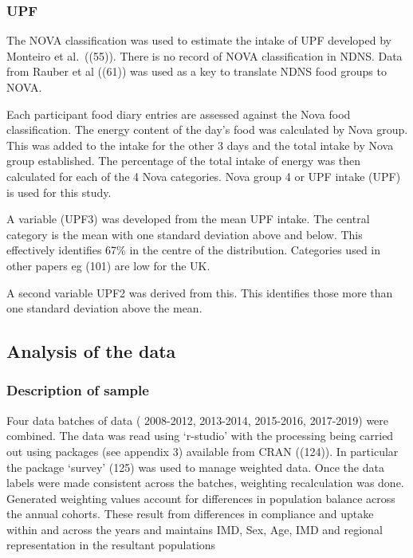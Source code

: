 \documentclass[
]{article}
\begin{document}
\hypertarget{upf}{%
\subsubsection{UPF}\label{upf}}

The NOVA classification was used to estimate the intake of UPF developed
by Monteiro et al.~((55)). There is no record of NOVA classification in
NDNS. Data from Rauber et al ((61)) was used as a key to translate NDNS
food groups to NOVA.

Each participant food diary entries are assessed against the Nova food
classification. The energy content of the day's food was calculated by
Nova group. This was added to the intake for the other 3 days and the
total intake by Nova group established. The percentage of the total
intake of energy was then calculated for each of the 4 Nova categories.
Nova group 4 or UPF intake (UPF) is used for this study.

A variable (UPF3) was developed from the mean UPF intake. The central
category is the mean with one standard deviation above and below. This
effectively identifies 67\% in the centre of the distribution.
Categories used in other papers eg (101) are low for the UK.

A second variable UPF2 was derived from this. This identifies those more
than one standard deviation above the mean.

\hypertarget{analysis-of-the-data}{%
\subsection{Analysis of the data}\label{analysis-of-the-data}}

\hypertarget{description-of-sample}{%
\subsubsection{Description of sample}\label{description-of-sample}}

Four data batches of data ( 2008-2012, 2013-2014, 2015-2016, 2017-2019)
were combined. The data was read using `r-studio' with the processing
being carried out using packages (see appendix 3) available from CRAN
((124)). In particular the package `survey' (125) was used to manage
weighted data. Once the data labels were made consistent across the
batches, weighting recalculation was done. Generated weighting values
account for differences in population balance across the annual cohorts.
These result from differences in compliance and uptake within and across
the years and maintains IMD, Sex, Age, IMD and regional representation
in the resultant populations
\end{document}
